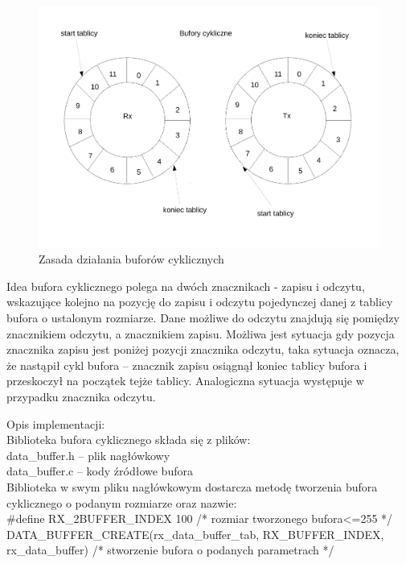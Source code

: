 \documentclass[a4paper,titlepage,11pt,floatssmall]{mwrep}
\begin{document}
\begin{figure}[H]
\centering
\includegraphics[width=\textwidth]{img/bufory_obrazek.pdf}
\caption{Zasada działania buforów cyklicznych}
\end{figure}

Idea bufora cyklicznego polega na dwóch znacznikach - zapisu i odczytu, wskazujące kolejno na pozycję do zapisu i odczytu pojedynczej danej z tablicy bufora o ustalonym rozmiarze.
Dane możliwe do odczytu znajdują się pomiędzy znacznikiem odczytu, a znacznikiem zapisu. 
Możliwa jest sytuacja gdy pozycja znacznika zapisu jest poniżej pozycji znacznika odczytu, taka sytuacja oznacza, że nastąpił cykl bufora – znacznik zapisu osiągnął koniec tablicy bufora i przeskoczył na początek tejże tablicy. Analogiczna sytuacja występuje w przypadku znacznika odczytu.

\newpage

Opis implementacji:\\
	Biblioteka bufora cyklicznego składa się z plików:\\
	\indent{}data\_{}buffer.h – plik nagłówkowy\\
	\indent{}data\_{}buffer.c – kody źródłowe bufora\\
	\medskip
Biblioteka w swym pliku nagłówkowym dostarcza metodę tworzenia bufora cyklicznego o podanym rozmiarze oraz nazwie:\\
	\indent{}\#{}define RX\_{}2BUFFER\_{}INDEX 100 /* rozmiar tworzonego bufora<=255 */\\
\indent{} DATA\_{}BUFFER\_{}CREATE(rx\_{}data\_{}buffer\_{}tab, RX\_{}BUFFER\_{}INDEX, rx\_{}data\_{}buffer) /* stworzenie bufora o podanych parametrach */\\
\end{document}
